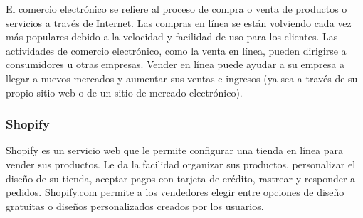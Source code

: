 El comercio electrónico se refiere al proceso de compra o venta de productos o servicios a través de Internet. 
Las compras en línea se están volviendo cada vez más populares debido a la velocidad y facilidad de uso para los clientes. 
Las actividades de comercio electrónico, como la venta en línea, pueden dirigirse a consumidores u otras empresas. 
Vender en línea puede ayudar a su empresa a llegar a nuevos mercados y aumentar sus ventas e ingresos 
(ya sea a través de su propio sitio web o de un sitio de mercado electrónico).
\subsubsection{Shopify}
Shopify es un servicio web que le permite configurar una tienda en línea para vender sus productos. 
Le da la facilidad organizar sus productos, personalizar el diseño de su tienda, 
aceptar pagos con tarjeta de crédito, rastrear y responder a pedidos. 
Shopify.com permite a los vendedores elegir entre opciones de diseño gratuitas 
o diseños personalizados creados por los usuarios.